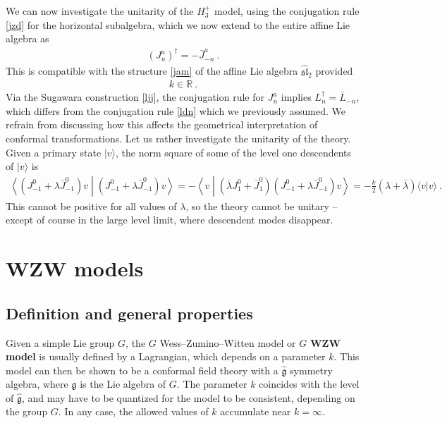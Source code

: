 \documentclass[12pt, a4paper, notitlepage, twoside]{report}
\numberwithin{equation}{section}
\theoremstyle{break}
\begin{document}
We can now investigate the unitarity of the $H_3^+$ model, using the conjugation rule \eqref{jzd} for the horizontal subalgebra, which we now extend to the entire affine Lie algebra as 
\begin{align}
 \boxed{(J^a_n)^\dagger = -\bar{J}^a_{-n}}\ .
\label{jdj}
\end{align}
This is compatible with the structure \eqref{jam} of the affine Lie algebra $\hat{\mathfrak{sl}}_2$ provided 
\begin{align}
 k\in\mathbb{R}\ .
\label{kir}
\end{align}
Via the Sugawara construction \eqref{ljj}, the conjugation rule for $J^a_n$ implies $L_n^\dagger = \bar{L}_{-n}$, which differs from the conjugation rule \eqref{ldn} which we previously assumed. 
We refrain from discussing how this affects the geometrical interpretation of conformal transformations.
Let us rather investigate the unitarity of the theory. 
Given a primary state $|v\rangle$, the norm square of some of the level one descendents of $|v\rangle$ is
\begin{align}
 \left\langle (J^0_{-1}+\lambda\bar{J}^0_{-1})v \middle| (J^0_{-1}+\lambda\bar{J}^0_{-1})v \right\rangle
= -\left\langle v \middle| (\bar{\lambda} J^0_1+\bar{J}^0_1)(J^0_{-1}+\lambda\bar{J}^0_{-1})v \right\rangle 
= -\frac{k}{2}(\lambda+\bar{\lambda}) \langle v| v\rangle\ .
\label{viv}
\end{align}
This cannot be positive for all values of $\lambda$,  
so the theory cannot be unitary -- except of course in the large level limit, where descendent modes disappear. 


\section{WZW models}

\subsection{Definition and general properties}

Given a simple Lie group $G$, the $G$ Wess--Zumino--Witten model or $G$ \textbf{\boldmath WZW model} is usually defined by a Lagrangian, which depends on a parameter $k$.
This model can then be shown to be a conformal field theory with a $\hat{\mathfrak{g}}$ symmetry algebra, where $\mathfrak{g}$ is the Lie algebra of $G$.
The parameter $k$ coincides with the level of $\hat{\mathfrak{g}}$, and may have to be quantized for the model to be consistent, depending on the group $G$.
In any case, the allowed values of $k$ accumulate near $k=\infty$.
\end{document}
